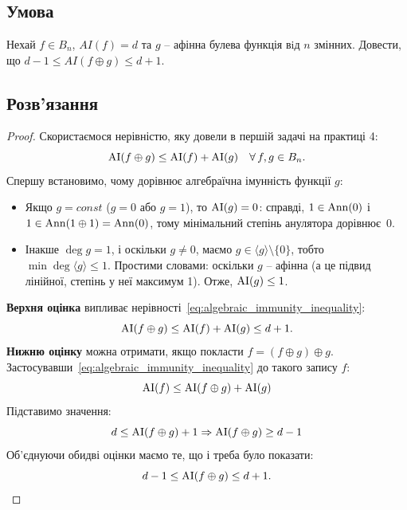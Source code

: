 \chapter{}
\label{chap:2}

\section{Умова}
Нехай $f \in B_{n}$, $AI (f) = d$ та $g$ -- афінна булева функція вiд $n$ змінних. Довести, що
$d - 1 \leq AI (f \oplus g) \leq d + 1$.

\section{Розв'язання}
\begin{proof}
    Скористаємося нерівністю, яку довели в першій задачі на практиці 4:
    \begin{equation}
        \label{eq:algebraic_immunity_inequality}
        \operatorname{AI}(f \oplus g) \leq \operatorname{AI}(f) + \operatorname{AI}(g) \quad \forall\, f, g \in B_{n}.
    \end{equation}
    Спершу встановимо, чому дорівнює алгебраїчна імунність функції $g$:
    \begin{itemize}
        \item Якщо $g = const$ ($g = 0$ або $g = 1$), то $\operatorname{AI}(g) = 0$: справді, $1 \in \operatorname{Ann}(0)$ і $1 \in \operatorname{Ann}(1 \oplus 1) = \operatorname{Ann}(0)$, 
            тому мінімальний степінь анулятора дорівнює~$0$.
        \item Інакше $\deg g = 1$, і оскільки $g \neq 0$, маємо $g \in \langle g \rangle \setminus \{0\}$, 
            тобто $\min \deg \langle g \rangle \leq 1$. Простими словами: оскільки $g$ -- афінна (а це підвид 
            лінійної, степінь у неї максимум 1). Отже, $\operatorname{AI}(g) \leq 1$.
    \end{itemize}
    \textbf{Верхня оцінка} випливає нерівності~\eqref{eq:algebraic_immunity_inequality}:
    \begin{equation*}
        \operatorname{AI}(f \oplus g) \leq \operatorname{AI}(f) + \operatorname{AI}(g) \leq d + 1.
    \end{equation*}
    \textbf{Нижню оцінку} можна отримати, якщо покласти $f = (f \oplus g) \oplus g$. Застосувавши~\eqref{eq:algebraic_immunity_inequality} 
    до такого запису $f$:
    \begin{equation*}
        \operatorname{AI}(f) \leq \operatorname{AI}(f \oplus g) + \operatorname{AI}(g)
    \end{equation*}
    Підставимо значення:
    \begin{equation*}
        d \leq \operatorname{AI}(f \oplus g) + 1 \Rightarrow \operatorname{AI}(f \oplus g) \geq d - 1
    \end{equation*}
    Об'єднуючи обидві оцінки маємо те, що і треба було показати:
    \begin{equation*}
        d - 1 \leq \operatorname{AI}(f \oplus g) \leq d + 1.
    \end{equation*}
\end{proof}
